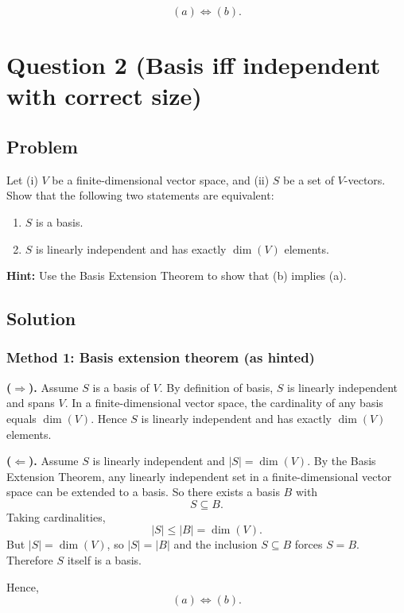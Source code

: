 \documentclass[12pt]{article}
\newcommand{\dimn}{\operatorname{dim}}
\begin{document}
\[
\boxed{\ (a)\Longleftrightarrow (b).\ }
\]
\newpage
\section{Question 2 (Basis iff independent with correct size)}
\subsection{Problem}
Let (i) \(V\) be a finite-dimensional vector space, and (ii) \(S\) be a set of \(V\)-vectors.
Show that the following two statements are equivalent:
\begin{enumerate}[label=(\alph*)]
\item \(S\) is a basis.
\item \(S\) is linearly independent and has exactly \(\dimn(V)\) elements.
\end{enumerate}
\noindent
\textbf{Hint:} Use the Basis Extension Theorem to show that (b) implies (a).

\subsection{Solution}

\subsubsection{Method 1: Basis extension theorem (as hinted)}
\textbf{(\(\Rightarrow\)).}
Assume \(S\) is a basis of \(V\).
By definition of basis, \(S\) is linearly independent and spans \(V\).
In a finite-dimensional vector space, the cardinality of any basis equals \(\dimn(V)\).
Hence \(S\) is linearly independent and has exactly \(\dimn(V)\) elements.

\textbf{(\(\Leftarrow\)).}
Assume \(S\) is linearly independent and \(|S|=\dimn(V)\).
By the Basis Extension Theorem, any linearly independent set in a finite-dimensional vector space can be extended to a basis.
So there exists a basis \(B\) with
\[
S\subseteq B.
\]
Taking cardinalities,
\[
|S|\le |B|=\dimn(V).
\]
But \(|S|=\dimn(V)\), so \(|S|=|B|\) and the inclusion \(S\subseteq B\) forces \(S=B\).
Therefore \(S\) itself is a basis.

Hence,
\[
\boxed{\ (a)\Longleftrightarrow (b).\ }
\]
\end{document}
